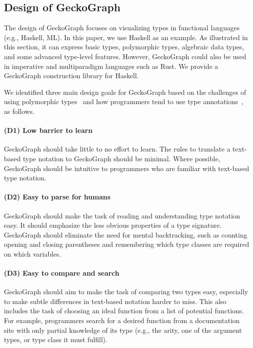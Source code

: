 \subsection{Design of GeckoGraph}
The design of GeckoGraph focuses on visualizing types in functional languages (e.g., Haskell, ML). In this paper, we use Haskell as an example. As illustrated in this section, it can express basic types, polymorphic types, algebraic data types, and some advanced type-level features. However, GeckoGraph could also be used in imperative and multiparadigm languages such as Rust. We provide a GeckoGraph construction library for Haskell. 
        
We identified three main design goals for GeckoGraph based on the challenges of using polymorphic types~\cite{Jun2000-ec, Jun2000-yu} and how programmers tend to use type annotations~\cite{Justin_Lubin2021-yy}, as follows. 

\paragraph{\textbf{(D1) Low barrier to learn}}\label{goal1} GeckoGraph should take little to no effort to learn. The rules to translate a text-based type notation to GeckoGraph should be minimal. Where possible, GeckoGraph should be intuitive to programmers who are familiar with text-based type notation.

\paragraph{\textbf{(D2) Easy to parse for humans}}  \label{goal2} GeckoGraph should make the task of reading and understanding type notation easy. It should emphasize the less obvious properties of a type signature. GeckoGraph should eliminate the need for mental backtracking, such as counting opening and closing parentheses and remembering which type classes are required on which variables. 


\paragraph{\textbf{(D3) Easy to compare and search}} \label{goal3} GeckoGraph should aim to make the task of comparing two types easy, especially to make subtle differences in text-based notation harder to miss. This also includes the task of choosing an ideal function from a list of potential functions. For example, programmers search for a desired function from a documentation site with only partial knowledge of its type (e.g., the arity, one of the argument types, or type class it must fulfill). 


